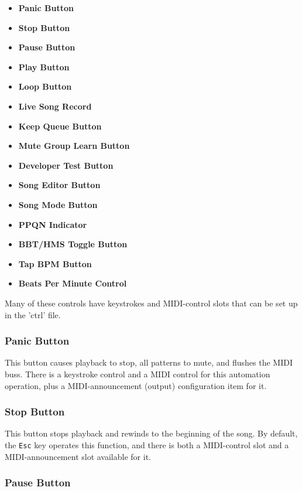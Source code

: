    \begin{itemize}
      \item \textbf{Panic Button}
      \item \textbf{Stop Button}
      \item \textbf{Pause Button}
      \item \textbf{Play Button}
      \item \textbf{Loop Button}
      \item \textbf{Live Song Record}
      \item \textbf{Keep Queue Button}
      \item \textbf{Mute Group Learn Button}
      \item \textbf{Developer Test Button}
      \item \textbf{Song Editor Button}
      \item \textbf{Song Mode Button}
      \item \textbf{PPQN Indicator}
      \item \textbf{BBT/HMS Toggle Button}
      \item \textbf{Tap BPM Button}
      \item \textbf{Beats Per Minute Control}
   \end{itemize}

   Many of these controls have keystrokes and MIDI-control slots that can be
   set up in the 'ctrl' file.

\subsubsection{Panic Button}
\label{subsubsec:introduction_panic_button}

   This button causes playback to stop, all patterns to mute, and flushes the
   MIDI buss.
   There is a keystroke control and a MIDI control
   for this automation operation, plus
   a MIDI-announcement (output) configuration item for it.

\subsubsection{Stop Button}
\label{subsubsec:introduction_stop_button}

   This button stops playback and rewinds to the beginning of the song.
   By default, the \texttt{Esc} key operates this function,
   and there is both a MIDI-control slot and a MIDI-announcement slot
   available for it.

\subsubsection{Pause Button}
\label{subsubsec:introduction_pause_button}

